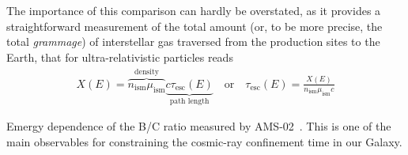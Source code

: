 The importance of this comparison can hardly be overstated, as it provides a
straightforward measurement of the total amount (or, to be more precise, the
total \emph{grammage}) of interstellar gas traversed from the production sites
to the Earth, that for ultra-relativistic particles reads
\begin{align*}
  X(E) = \overbrace{n_\text{ism} \mu_\text{ism}}^{\text{density}}
    \underbrace{c \tau_\text{esc}(E)}_{\text{path length}} \quad\text{or}\quad
  \tau_\text{esc}(E) = \frac{X(E)}{n_\text{ism} \mu_\text{ism} c}
\end{align*}

\begin{marginfigure}
  
  \caption{Emergy dependence of the B/C ratio measured by AMS-02~\cite{2021PhR...894....1A}.
    This is one of the main observables for constraining the cosmic-ray
    confinement time in our Galaxy.}
  \label{fig:cr_bc_ratio}
\end{marginfigure}


